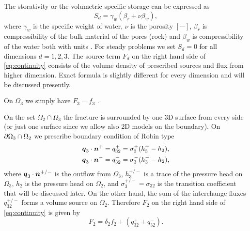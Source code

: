 The storativity 
 or the volumetric specific storage  can be expressed as
\begin{equation}
  S_d = \gamma_w(\beta_r + \nu \beta_w),
\end{equation}
where $\gamma_w$  is the specific weight of water, $\nu$ is the porosity $[-]$, $\beta_r$ is compressibility of the bulk material of the pores (rock)
and $\beta_w$ is compressibility of the water both with units . For steady problems we set $S_d=0$ for all dimensions $d=1,2,3$.
The source term $F_d$  on the right hand side of \eqref{eq:continuity} consists of the volume density of prescribed sources 
  and flux from higher dimension. 
Exact formula is slightly different for every dimension and will be discussed presently.

On $\Omega_3$ we simply have $F_3  = f_3$ .

On the set $\Omega_2 \cap \Omega_3$ the fracture is surrounded by one 3D surface from every side (or just one surface since we allow also 2D models on the boundary).
On $\partial\Omega_3 \cap \Omega_2$ we prescribe boundary condition of Robin type
\begin{align*}
        \mathbf{\boldsymbol{q}}_3\cdot \mathbf{\boldsymbol{n}}^{+} &= q_{32}^{+} =\sigma_{3}^{+} (h_3^{+}-h_2),\\
        \mathbf{\boldsymbol{q}}_3\cdot \mathbf{\boldsymbol{n}}^{-} &= q_{32}^{-} =\sigma_{3}^{-} (h_3^{-}-h_2),
\end{align*}
where $\mathbf{\boldsymbol{q}}_3\cdot\mathbf{\boldsymbol{n}}^{+/-}$  is the outflow from $\Omega_3$, $h_3^{+/-}$ is
a trace of the pressure head on $\Omega_3$, $h_2$ is the pressure head on $\Omega_2$, and 
$\sigma_{3}^{+/-}=\sigma_{32}$  is the transition coefficient that will be discussed later. 
On the other hand, the sum of the interchange fluxes $q_{32}^{+/-}$ forms
a volume source on $\Omega_2$.  Therefore $F_2$  on the right hand side of \eqref{eq:continuity} is
given by
\begin{equation}
   \label{source_2D}
   F_2 = \delta_2 f_2 + (q_{32}^{+} + q_{32}^{-}).
\end{equation}

